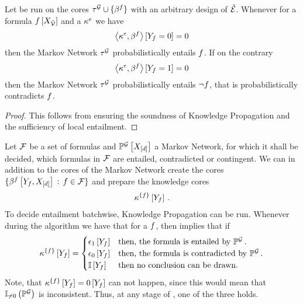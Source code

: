 \begin{corollary}
    \label{cor:knowledgePropagationMarkovNetworks}
    Let  be run on the cores $\tau^{\mathcal{G}}\cup\{\beta^{f}\}$ with an arbitrary design of $\tilde{\mathcal{E}}$.
    Whenever for a formula $f\left[X_{\tilde{\mathcal{V}}}\right]$ and a $\kappa^{e}$ we have
    \[ \left\langle \kappa^{e},\beta^{f}\right\rangle \left[ Y_{f}=0 \right] =0  \]
    then the Markov Network $\tau^{\mathcal{G}}$ probabilistically entails $f$.
    If on the contrary
    \[ \left\langle \kappa^{e},\beta^{f}\right\rangle \left[ Y_{f}=1 \right] =0  \]
    then the Markov Network $\tau^{\mathcal{G}}$ probabilistically entails $\lnot f$, that is probabilistically contradicts $f$.
\end{corollary}
\begin{proof}
    This follows from  ensuring the soundness of Knowledge Propagation and the sufficiency of local entailment.
\end{proof}

\begin{example}
    Let $\mathcal{F}$ be a set of formulas and $\mathbb{P}^{\mathcal{G}}\left[X_{[d]}\right]$ a Markov Network, for which it shall be decided, which formulas in $\mathcal{F}$ are entailed, contradicted or contingent.
    We can in addition to the cores of the Markov Network create the cores $\{\beta^{f}\left[Y_{f},X_{[d]}\right] \,:\, f\in\mathcal{F}\}$ and prepare the knowledge cores
    \begin{align*}
        \kappa^{\{f\}}\left[Y_{f}\right] \, .
    \end{align*}
    To decide entailment batchwise, Knowledge Propagation  can be run.
    Whenever during the algorithm we have that for a $f$, then  implies that if
    \begin{align*}
        \kappa^{\{f\}}\left[Y_{f}\right] =
        \begin{cases}
            \epsilon_{1}\left[Y_{f}\right] & \text{then, the formula is entailed by }\mathbb{P}^{\mathcal{G}} \, . \\
            \epsilon_{0}\left[Y_{f}\right] & \text{then, the formula is contradicted by }\mathbb{P}^{\mathcal{G}} \, .\\
            \mathbb{I}\left[Y_{f}\right] & \text{then no conclusion can be drawn.}
        \end{cases}
    \end{align*}
    Note, that $\kappa^{\{f\}}\left[Y_{f}\right] = 0\left[Y_{f}\right]$ can not happen, since this would mean that $\mathbb{I}_{\neq0}\left(\mathbb{P}^{\mathcal{G}}\right)$ is inconsistent.
    Thus, at any stage of , one of the three holds.
\end{example}



